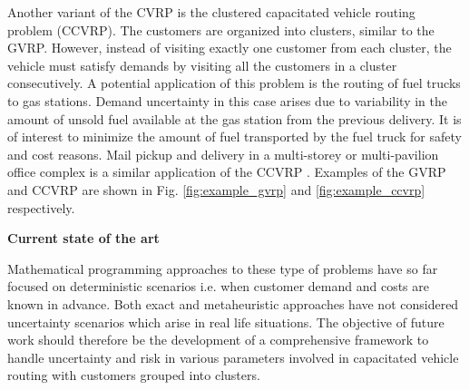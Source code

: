 \documentclass[letterpaper,12pt,onehalfspacing,twoside]{article}
\theoremstyle{msds}
\begin{document}
Another variant of the CVRP is the clustered capacitated vehicle routing problem (CCVRP). The customers are organized into clusters, similar to the GVRP. However, instead of visiting exactly one customer from each cluster, the vehicle must satisfy demands by visiting all the customers in a cluster consecutively. A potential application of this problem is the routing of fuel trucks to gas stations. Demand uncertainty in this case arises due to variability in the amount of unsold fuel available at the gas station from the previous delivery. It is of interest to minimize the amount of fuel transported by the fuel truck for safety and cost reasons.
Mail pickup and delivery in a multi-storey or multi-pavilion office complex is a similar application of the CCVRP \citep{laporteandpalekar}. Examples of the GVRP and CCVRP are shown in Fig. \ref{fig:example_gvrp} and \ref{fig:example_ccvrp} respectively.

\textbf{Current state of the art}

Mathematical programming approaches to these type of problems have so far focused on deterministic scenarios i.e. when customer demand and costs are known in advance. Both exact \citep{bektasKara, POP201297} and metaheuristic approaches \citep{Noon, GHIANI200011,  doi:10.1063/1.3130618} have not considered uncertainty scenarios which arise in real life situations. The objective of future work should therefore be the development of a comprehensive framework to handle uncertainty and risk in various parameters involved in capacitated vehicle routing with customers grouped into clusters.
\end{document}
